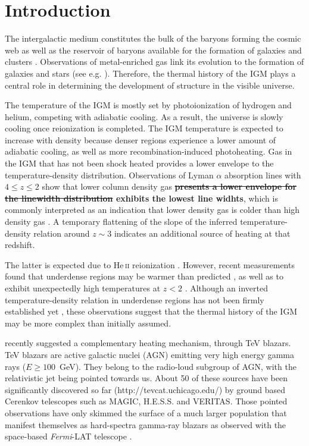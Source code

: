 \documentclass[numberedappendix]{emulateapj}
\newcommand\Ec[1]{{\color{magenta} \bf #1}} %
\begin{document}
\section{Introduction}
The intergalactic medium constitutes the bulk of the baryons forming the cosmic web \citep{1996Natur.380..603B} as well as the reservoir of baryons available for the formation of galaxies and clusters \citep{1997ApJ...489....7R}. Observations of metal-enriched gas link its evolution to the formation of galaxies and stars (see e.g. \citet{2009A&A...493..409S,2010MNRAS.407.2063W}). Therefore, the thermal history of the IGM plays a central role in determining the development of structure in the visible universe.

The temperature of the IGM is mostly set by photoionization of hydrogen and helium, competing with adiabatic cooling. As a result, the universe is slowly cooling once reionization is completed. The IGM temperature is expected to increase with density because denser regions experience a lower amount of adiabatic cooling, as well as more recombination-induced photoheating. Gas in the IGM that has not been shock heated provides a lower envelope to the temperature-density distribution.  Observations of Lyman $\alpha$ absorption lines with $4\leqslant z \leqslant 2$ show that lower column density gas \Ec{\sout{presents a lower envelope for the linewidth distribution} exhibits the lowest line widhts}, which is commonly interpreted as an indication that lower density gas is colder than high density gas \citep{2000MNRAS.318..817S,2000ApJ...534...41R,2012ApJ...757L..30R}. A temporary flattening of the slope of the inferred temperature-density relation around $z\sim 3$ indicates an additional source of heating at that redshift.

The latter is expected due to He\,\textsc{ii} reionization \citep[e.g.][]{2009ApJ...694..842M,2013MNRAS.435.3169C,2014arXiv1410.1531P}. However, recent measurements found that underdense regions may be warmer than predicted \citep{2009MNRAS.399L..39V,2008MNRAS.386.1131B}, as well as to exhibit unexpectedly high temperatures at $z<2$ \citep{2014MNRAS.441.1916B}. Although an inverted temperature-density relation in underdense regions has not been firmly established yet \citep{2014MNRAS.438.2499B}, these observations suggest that the thermal history of the IGM may be more complex than initially assumed.

\citet{2012ApJ...752...22B} recently suggested a complementary heating mechanism, through TeV blazars. TeV blazars are active galactic nuclei (AGN) emitting very high energy gamma rays ($E\ge100$~GeV). They belong to the radio-loud subgroup of AGN, with the relativistic jet being pointed towards us. About 50 of these sources have been significantly discovered so far (http://tevcat.uchicago.edu/) by ground based Cerenkov telescopes such as MAGIC, H.E.S.S. and VERITAS. Those pointed observations have only skimmed the surface of a much larger population that manifest themselves as hard-spectra gamma-ray blazars as observed with the space-based \textit{Fermi}-LAT telescope \citep{2014ApJ...790..137B}. 
\end{document}
